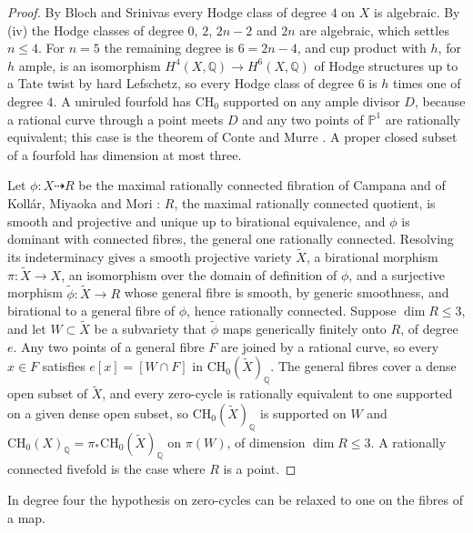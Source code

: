 \documentclass[11pt,reqno]{amsart}
\theoremstyle{plain}
\theoremstyle{definition}
\theoremstyle{remark}
\newcommand{\QQ}{\mathbb{Q}}
\newcommand{\PP}{\mathbb{P}}
\begin{document}
\begin{proof}
By Bloch and Srinivas \cite{BS83} every Hodge class of degree $4$ on $X$ is
algebraic. By (iv) the Hodge classes of degree $0$, $2$,
$2n-2$ and $2n$ are algebraic, which settles $n\le4$. For $n=5$ the remaining
degree is $6=2n-4$, and cup product with $h$, for $h$ ample, is an isomorphism
$H^{4}(X,\QQ)\to H^{6}(X,\QQ)$ of Hodge structures up to a Tate twist by hard
Lefschetz, so every Hodge class of degree $6$ is $h$ times one of degree $4$.
A uniruled fourfold has $\mathrm{CH}_{0}$ supported on any ample divisor $D$,
because a rational curve through a point meets $D$ and any two points of
$\PP^{1}$ are rationally equivalent; this case is the theorem of Conte and
Murre \cite{CM78}. A proper closed subset of a fourfold has dimension at
most three.

Let $\phi\colon X\dashrightarrow R$ be the maximal rationally connected
fibration of Campana and of Koll\'ar, Miyaoka and Mori \cite{Cam92,KMM92}:
$R$, the maximal rationally connected quotient, is smooth and projective and
unique up to birational equivalence, and $\phi$ is dominant with connected
fibres, the general one rationally connected. Resolving its indeterminacy
\cite{Hir64} gives a smooth projective variety $\widetilde X$, a birational
morphism $\pi\colon\widetilde X\to X$, an isomorphism over the domain of
definition of $\phi$, and a surjective
morphism $\widetilde\phi\colon\widetilde X\to R$ whose general fibre is
smooth, by generic smoothness, and birational to a general fibre of $\phi$,
hence rationally connected. Suppose $\dim R\le3$, and let
$W\subset\widetilde X$ be a subvariety that $\widetilde\phi$ maps generically
finitely onto $R$, of degree $e$. Any two points of a general fibre $F$ are
joined by a rational curve, so every $x\in F$ satisfies $e[x]=[W\cap F]$ in
$\mathrm{CH}_{0}(\widetilde X)_{\QQ}$. The general fibres cover a dense open
subset of $\widetilde X$, and every zero-cycle is rationally equivalent to
one supported on a given dense open subset, so
$\mathrm{CH}_{0}(\widetilde X)_{\QQ}$ is supported on $W$ and
$\mathrm{CH}_{0}(X)_{\QQ}=\pi_{*}\mathrm{CH}_{0}(\widetilde X)_{\QQ}$ on
$\pi(W)$, of dimension $\dim R\le3$. A rationally connected fivefold is the
case where $R$ is a point.
\end{proof}

In degree four the hypothesis on zero-cycles can be relaxed to one on the
fibres of a map.
\end{document}

